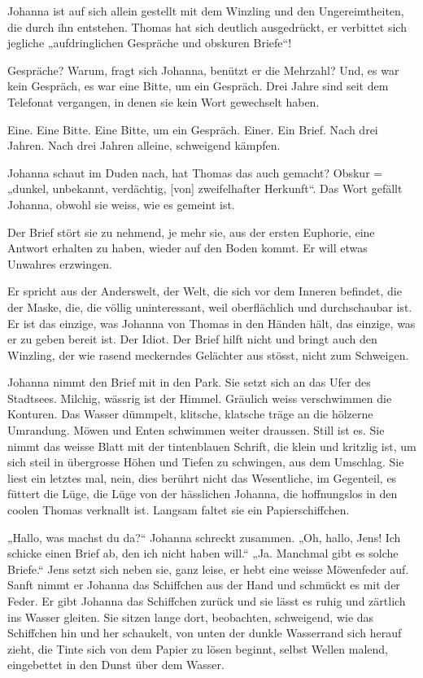 \documentclass[10pt,a5paper]{book}
\begin{document}
Johanna ist auf sich allein gestellt mit dem Winzling und den Ungereimtheiten, die durch ihn entstehen. Thomas hat sich deutlich ausgedrückt, er verbittet sich jegliche „aufdringlichen Gespräche und obskuren Briefe“! 

Gespräche? Warum, fragt sich Johanna, benützt er die Mehrzahl? Und, es war kein Gespräch, es war eine Bitte, um ein Gespräch. Drei Jahre sind seit dem Telefonat vergangen, in denen sie kein Wort gewechselt haben. 

Eine. Eine Bitte. Eine Bitte, um ein Gespräch. Einer. Ein Brief. Nach drei Jahren. Nach drei Jahren alleine, schweigend kämpfen.

Johanna schaut im Duden nach, hat Thomas das auch gemacht? Obskur =  „dunkel, unbekannt, verdächtig, [von] zweifelhafter Herkunft“. Das Wort gefällt Johanna, obwohl sie weiss, wie es gemeint ist.

Der Brief stört sie zu nehmend, je mehr sie, aus der ersten Euphorie, eine Antwort erhalten zu haben, wieder auf den Boden kommt. Er will etwas Unwahres erzwingen. 

Er spricht aus der Anderswelt, der Welt, die sich vor dem Inneren befindet, die der Maske, die, die völlig uninteressant, weil oberflächlich und durchschaubar ist. Er ist das einzige, was Johanna von Thomas in den Händen hält, das einzige, was er zu geben bereit ist. Der Idiot. Der Brief hilft nicht und bringt auch den Winzling, der wie rasend meckerndes Gelächter aus stösst, nicht zum Schweigen.

Johanna nimmt den Brief mit in den Park. Sie setzt sich an das Ufer des Stadtsees. Milchig, wässrig ist der Himmel. Gräulich weiss verschwimmen die Konturen. Das Wasser dümmpelt, klitsche, klatsche träge an die hölzerne Umrandung. Möwen und Enten schwimmen weiter draussen. Still ist es. Sie nimmt das weisse Blatt mit der tintenblauen Schrift, die klein und kritzlig ist, um sich steil in übergrosse Höhen und Tiefen zu schwingen, aus dem Umschlag. Sie liest ein letztes mal, nein, dies berührt nicht das Wesentliche, im Gegenteil, es füttert die Lüge, die Lüge von der hässlichen Johanna, die hoffnungslos in den coolen Thomas verknallt ist. Langsam faltet sie ein Papierschiffchen. 

„Hallo, was machst du da?“ Johanna schreckt zusammen. „Oh, hallo, Jens! Ich schicke einen Brief ab, den ich nicht haben will.“ „Ja. Manchmal gibt es solche Briefe.“ Jens setzt sich neben sie, ganz leise, er hebt eine weisse Möwenfeder auf. Sanft nimmt er Johanna das Schiffchen aus der Hand und schmückt es mit der Feder. Er gibt Johanna das Schiffchen zurück und sie lässt es ruhig und zärtlich ins Wasser gleiten. Sie sitzen lange dort, beobachten, schweigend, wie das Schiffchen hin und her schaukelt, von unten der dunkle Wasserrand sich herauf zieht, die Tinte sich von dem Papier zu lösen beginnt, selbst Wellen malend, eingebettet in den Dunst über dem Wasser.
\end{document}

